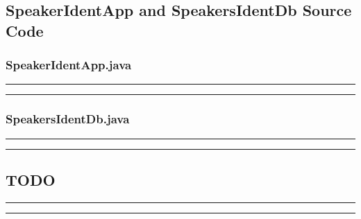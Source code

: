 \clearpage

\begin{center}
	\subsection{SpeakerIdentApp and SpeakersIdentDb Source Code}
\end{center}

\subsubsection{SpeakerIdentApp.java}

\vspace{15pt}
\hrule
{\scriptsize }
\hrule
\vspace{15pt}

\subsubsection{SpeakersIdentDb.java}

\vspace{15pt}
\hrule
{\scriptsize }
\hrule
\vspace{15pt}

\clearpage

\begin{center}
	\subsection{TODO}\label{appx:todo}
\end{center}

\vspace{15pt}
\hrule
{\scriptsize }
\hrule
\vspace{15pt}
